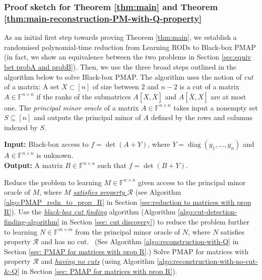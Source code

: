 \documentclass[11pt,letterpaper]{article}
\DeclareMathOperator*{\diag}{diag}
\newcommand{\comp}[1]{\overline{#1}}
\newcommand{\F}{\mathbb{F}}
\newcommand{\prop}{\mathcal{R}}
\begin{document}
{\subsubsection{Proof sketch for Theorem \ref{thm:main} and Theorem \ref{thm:main-reconstruction-PM-with-Q-property}} \label{sec:ideas thm main}
As an initial first step towards proving Theorem \ref{thm:main}, we establish a randomised polynomial-time reduction from Learning RODs to Black-box PMAP (in fact, we show an equivalence between the two problems in Section \ref{sec:equiv bet probA and probB}). Then, we use the three broad steps outlined in the algorithm below to solve Black-box PMAP. The algorithm uses the notion of \emph{cut} of a matrix: A set $X \subset [n]$ of size between $2$ and $n-2$ is a cut of a matrix $A \in \F^{n \times n}$ if the ranks of the submatrices $A[X, \comp{X}]$ and $A[\comp{X}, X]$ are at most one. The \emph{principal minor oracle} of a matrix $A \in \F^{n \times n}$ takes input a nonempty set $S \subseteq [n]$ and outputs the principal minor of $A$ defined by the rows and columns indexed by $S$.

\begin{algorithm}[H]
\caption{Black-box PMAP}
\label{algo:Black-box PMAP}
\textbf{Input:} Black-box access to $f = \det(A + Y)$, where $Y = \diag(y_1, \ldots, y_n)$ and $A \in\F^{n\times n}$ is unknown.\\
\textbf{Output:} A matrix $B \in \F^{n\times n}$ such that $f = \det(B + Y)$. 
\begin{algorithmic}[1]
\State Reduce the problem to learning $M \in \F^{n \times n}$ given access to the principal minor oracle of $M$, where $M$ \underline{\emph{satisfies property $\prop$}} (see Algorithm \ref{algo:PMAP_redn_to_prop_R} in Section \ref{sec:reduction to matrices with prop R}).
\State Use the \underline{\emph{black-box cut finding}} algorithm (Algorithm \ref{algo:cut-detection-finding-algorithm} in Section \ref{sec: cut discovery}) to reduce the problem further to learning $N \in \F^{m \times m}$ from the principal minor oracle of $N$, where $N$ satisfies property $\prop$ and has no cut. ~(See Algorithm \ref{algo:reconstruction-with-Q} in Section \ref{sec: PMAP for matrices with prop R}.)
\State Solve PMAP for matrices with property $\prop$ and \underline{\emph{having no cuts}} (using Algorithm \ref{algo:reconstruction-with-no-cut-&-Q} in Section \ref{sec: PMAP for matrices with prop R}).
\end{algorithmic}
\end{algorithm}

}
\end{document}
